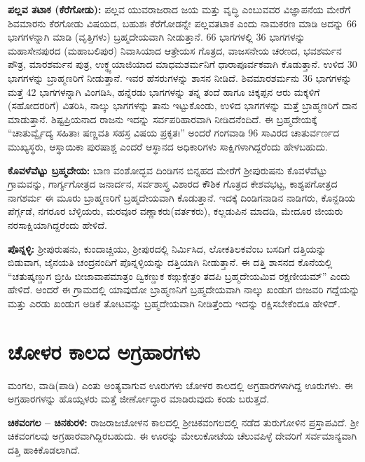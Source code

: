 \textbf{ಪಲ್ಲವ ತಟಾಕ (ಕೆರೆಗೋಡು):} ಪಲ್ಲವ ಯುವರಾಜರಾದ ಜಯ ಮತ್ತು ವೃದ್ಧಿ ಎಂಬುವವರ ವಿಜ್ಞಾಪನೆಯ ಮೇರೆಗೆ ಶಿವಮಾರನು ಕೆರಗೋಡು ವಿಷಯದ, ಬಹುಶಃ ಕೆರೆಗೋಡನ್ನೇ ಪಲ್ಲವತಟಾಕ ಎಂದು ನಾಮಕರಣ ಮಾಡಿ ಅದನ್ನು 66 ಭಾಗಗಳನ್ನಾಗಿ ಮಾಡಿ (ವೃತ್ತಿಗಳು) ಬ್ರಹ್ಮದೇಯವಾಗಿ ನೀಡುತ್ತಾನೆ. 66 ಭಾಗಗಳಲ್ಲಿ 36 ಭಾಗಗಳನ್ನು ಮಹಾಸೇನಪುರದ (ಮಹಾಬಲಿಪುರ) ನಿವಾಸಿಯಾದ ಆತ್ರೇಯಸ ಗೊತ್ರದ, ವಾಜಸನೇಯ ಚರಣದ, ಭವಶರ್ಮನ ಪೌತ್ರ, ಮಾರಶರ್ಮನ ಪುತ್ರ, ಉಕ್ಥ್ಯಯಾಜಿಯಾದ ಮಾಧಮಶರ್ಮನಿಗೆ ಧಾರಾಪೂರ್ವಕವಾಗಿ ಕೊಡುತ್ತಾನೆ. ಉಳಿದ 30 ಭಾಗಗಳನ್ನು ಬ್ರಾಹ್ಮಣರಿಗೆ ನೀಡುತ್ತಾನೆ. ಇವರ ಹೆಸರುಗಳನ್ನು ಶಾಸನ ನೀಡಿದೆ. ಶಿವಮಾರಶರ್ಮನು 36 ಭಾಗಗಳನ್ನು ಮತ್ತೆ 42 ಭಾಗಗಳನ್ನಾಗಿ ವಿಂಗಡಿಸಿ, ಹನ್ನೆರಡು ಭಾಗಗಳನ್ನು ತನ್ನ ತಂದೆ ಹಾಗೂ ಚಿಕ್ಕಪ್ಪನ ಆರು ಮಕ್ಕಳಿಗೆ (ಸಹೋದರರಿಗೆ) ವಿತರಿಸಿ, ನಾಲ್ಕು ಭಾಗಗಳನ್ನು ತಾನು ಇಟ್ಟುಕೊಂಡು, ಉಳಿದ ಭಾಗಗಳನ್ನು ಮತ್ತೆ ಬ್ರಾಹ್ಮಣರಿಗೆ ದಾನ ಮಾಡುತ್ತಾನೆ. ಶಿಷ್ಟಪ್ರಿಯನಾದ ರಾಜನು ಇದನ್ನು ಸರ್ವಪರಿಹಾರವಾಗಿ ನೀಡಿದನೆಂದಿದೆ. ಈ ಬ್ರಹ್ಮದೇಯಕ್ಕೆ “ಚಾತುರ್ವ್ವೈದ್ಯ ಸಹಿತಾಃ ಷಣ್ಣವತಿ ಸಹಸ್ರ ವಿಷಯ ಪ್ರಕೃತಃ” ಅಂದರೆ ಗಂಗವಾಡಿ 96 ಸಾವಿರದ ಚಾತುರ್ವರ್ಣದ ಮುಖ್ಯಸ್ಥರು, ಆಸ್ಥಾಯಿಕಾ ಪುರಷಾಶ್ಚ ಎಂದರೆ ಆಸ್ಥಾನದ ಅಧಿಕಾರಿಗಳು ಸಾಕ್ಷಿಗಳಾಗಿದ್ದರೆಂದು ಹೇಳಬಹುದು.

\textbf{ಕೊವಳೆವೆಟ್ಟು ಬ್ರಹ್ಮದೇಯ:} ಬಾಣ ವಂಶೋದ್ಭವ ದಿಂಡಿಗನ ಬಿನ್ನಹದ ಮೇರೆಗೆ ಶ‍್ರೀಪುರುಷನು ಕೊವಳೆವೆಟ್ಟು ಗ್ರಾಮವನ್ನು, ಗಾರ್ಗ್ಯಗೋತ್ರದ ಜನಾರ್ದನ, ಸರ್ವಶಾಸ್ತ್ರ ವಿಶಾರದ ಕೌಶಿಕ ಗೊತ್ರದ ಕೇಶವಭಟ್ಟ, ಕಾಶ್ಯಪಗೋತ್ರದ ನಾಗಶರ್ಮ ಈ ಮೂರು ಬ್ರಾಹ್ಮಣರಿಗೆ ಬ್ರಹ್ಮದೇಯವಾಗಿ ಕೊಡುತ್ತಾನೆ. ಇದಕ್ಕೆ ದಿಂಡಿಗನಾಡಿನ ನಾಡಿಗರು, ಕೊನ್ದಡಿಯ ಪೆರ್ಗ್ಗಡೆ, ನಗರೂರ ಬೆಳ್ಳಿಯರು, ಮರವೂರ ವಣ್ಣಾಕರು(ವರ್ತಕರು), ಕಲ್ಲಡುಪಿನ ಮಾದಡಿ, ಮೇದೂರ ಜೀಯರು ನರಸಾಕ್ಷಿಯಾಗಿದ್ದರೆಂದು ಹೇಳಿದೆ.

\textbf{ಪೊನ್ನಳ್ಳಿ:} ಶ‍್ರೀಪುರುಷನು, ಕುಂದಾಚ್ಚಿಯು, ಶ‍್ರೀಪುರದಲ್ಲಿ ನಿರ್ಮಿಸಿದ, ಲೋಕತಿಲಕವೆಂಬ ಬಸದಿಗೆ ದತ್ತಿಯನ್ನು ಬಿಡುವಾಗ, ಜೈನಯತಿ ಚಂದ್ರನಂದಿಗೆ ಪೊನ್ನಳ್ಳಿಯನ್ನು ದತ್ತಿಯಾಗಿ ನೀಡುತ್ತಾನೆ. ಈ ದತ್ತಿ ಶಾಸನದ ಕೊನೆಯಲ್ಲಿ “ಚತುಷ್ಕಣ್ಡುಗ ಬ್ರೀಹಿ ಬೀಜಾವಾಪಮಾತ್ರಂ ದ್ವಿಕಣ್ಡುಕ ಕಙ್ಗುಕ್ಸೇತ್ರಂ ತದಪಿ ಬ್ರಹ್ಮದೇಯಮಿವ ರಕ್ಷಣೀಯಮ್” ಎಂದು ಹೇಳಿದೆ. ಅಂದರೆ ಈ ಗ್ರಾಮದಲ್ಲಿ ಯಾವುದೋ ಬ್ರಾಹ್ಮಣನಿಗೆ ಬ್ರಹ್ಮದೇಯವಾಗಿ ನಾಲ್ಕು ಖಂಡುಗ ಬೀಜವರಿ ಗದ್ದೆಯನ್ನು ಮತ್ತು ಎರಡು ಖಂಡುಗ ಅಡಿಕೆ ತೋಟವನ್ನು ಬ್ರಹ್ಮದೇಯವಾಗಿ ನೀಡಿತ್ತೆಂದು ಇದನ್ನು ರಕ್ಷಿಸಬೇಕೆಂದೂ ಹೇಳಿದ್.


\section{ಚೋಳರ ಕಾಲದ ಅಗ್ರಹಾರಗಳು}

ಮಂಗಲ, ವಾಡಿ(ಪಾಡಿ) ಎಂತು ಅಂತ್ಯವಾಗುವ ಊರುಗಳು ಚೋಳರ ಕಾಲದಲ್ಲಿ ಅಗ್ರಹಾರಗಳಾಗಿದ್ದ ಊರುಗಳು. ಈ ಅಗ್ರಹಾರಗಳನ್ನು ಹೊಯ್ಸಳರು ಮತ್ತೆ ಜೀರ್ಣೋದ್ಧಾರ ಮಾಡಿರುವುದು ಕಂಡು ಬರುತ್ತದೆ.

\textbf{ಚಿಕವಂಗಲ – ಚಿನಕುರಳಿ:} ರಾಜರಾಜಚೋಳನ ಕಾಲದಲ್ಲಿ ಶ‍್ರೀಚಿಕವಂಗಲದಲ್ಲಿ ನಡೆದ ತುರುಗೋಳಿನ ಪ್ರಸ್ತಾಪವಿದೆ. ಶ‍್ರೀ ಚಿಕವಂಗಲವು ಅಗ್ರಹಾರವಾಗಿದ್ದಿರಬಹುದು. ಈ ಊರನ್ನು ಮೇಲುಕೋಟೆಯ ಚೆಲುವಪಿಳ್ಳೆ ದೇವರಿಗೆ ಸರ್ವಮಾನ್ಯವಾಗಿ ದತ್ತಿ ಹಾಕಿಕೊಡಲಾಗಿದೆ.

